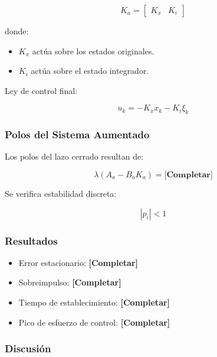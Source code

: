 \[
K_a =
\begin{bmatrix}
	K_x & K_i
\end{bmatrix}
\]

donde:

\begin{itemize}
	\item $K_x$ actúa sobre los estados originales.
	\item $K_i$ actúa sobre el estado integrador.
\end{itemize}

Ley de control final:

\[
u_k = -K_x x_k - K_i \xi_k
\]


\subsubsection{Polos del Sistema Aumentado}

Los polos del lazo cerrado resultan de:

\[
\lambda(A_a - B_a K_a)
=
\textbf{[Completar]}
\]

Se verifica estabilidad discreta:

\[
|p_i| < 1
\]


\subsubsection{Resultados}

\begin{itemize}
	\item Error estacionario: \textbf{[Completar]}
	\item Sobreimpulso: \textbf{[Completar]}
	\item Tiempo de establecimiento: \textbf{[Completar]}
	\item Pico de esfuerzo de control: \textbf{[Completar]}
\end{itemize}




\subsubsection{Discusión}

